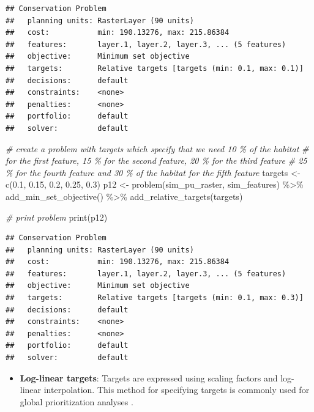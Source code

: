 \documentclass[
  12pt,
]{book}
\newenvironment{Shaded}{\begin{snugshade}}{\end{snugshade}}
\newcommand{\CommentTok}[1]{\textcolor[rgb]{0.56,0.35,0.01}{\textit{#1}}}
\newcommand{\FloatTok}[1]{\textcolor[rgb]{0.00,0.00,0.81}{#1}}
\newcommand{\FunctionTok}[1]{\textcolor[rgb]{0.00,0.00,0.00}{#1}}
\newcommand{\NormalTok}[1]{#1}
\newcommand{\OtherTok}[1]{\textcolor[rgb]{0.56,0.35,0.01}{#1}}
\newcommand{\SpecialCharTok}[1]{\textcolor[rgb]{0.00,0.00,0.00}{#1}}
\providecommand{\tightlist}{%
  \setlength{\itemsep}{0pt}\setlength{\parskip}{0pt}}
\begin{document}
\begin{verbatim}
## Conservation Problem
##   planning units: RasterLayer (90 units)
##   cost:           min: 190.13276, max: 215.86384
##   features:       layer.1, layer.2, layer.3, ... (5 features)
##   objective:      Minimum set objective 
##   targets:        Relative targets [targets (min: 0.1, max: 0.1)]
##   decisions:      default
##   constraints:    <none>
##   penalties:      <none>
##   portfolio:      default
##   solver:         default
\end{verbatim}

\begin{Shaded}
\begin{Highlighting}[]
\CommentTok{\# create a problem with targets which specify that we need 10 \% of the habitat}
\CommentTok{\# for the first feature, 15 \% for the second feature, 20 \% for the third feature}
\CommentTok{\# 25 \% for the fourth feature and 30 \% of the habitat for the fifth feature}
\NormalTok{targets }\OtherTok{\textless{}{-}} \FunctionTok{c}\NormalTok{(}\FloatTok{0.1}\NormalTok{, }\FloatTok{0.15}\NormalTok{, }\FloatTok{0.2}\NormalTok{, }\FloatTok{0.25}\NormalTok{, }\FloatTok{0.3}\NormalTok{)}
\NormalTok{p12 }\OtherTok{\textless{}{-}} \FunctionTok{problem}\NormalTok{(sim\_pu\_raster, sim\_features) }\SpecialCharTok{\%\textgreater{}\%}
  \FunctionTok{add\_min\_set\_objective}\NormalTok{() }\SpecialCharTok{\%\textgreater{}\%}
  \FunctionTok{add\_relative\_targets}\NormalTok{(targets)}

\CommentTok{\# print problem}
\FunctionTok{print}\NormalTok{(p12)}
\end{Highlighting}
\end{Shaded}

\begin{verbatim}
## Conservation Problem
##   planning units: RasterLayer (90 units)
##   cost:           min: 190.13276, max: 215.86384
##   features:       layer.1, layer.2, layer.3, ... (5 features)
##   objective:      Minimum set objective 
##   targets:        Relative targets [targets (min: 0.1, max: 0.3)]
##   decisions:      default
##   constraints:    <none>
##   penalties:      <none>
##   portfolio:      default
##   solver:         default
\end{verbatim}

\begin{itemize}
\tightlist
\item
  \textbf{Log-linear targets}: Targets are expressed using scaling factors and log-linear interpolation. This method for specifying targets is commonly used for global prioritization analyses \citep{r15}.
\end{itemize}
\end{document}
